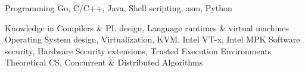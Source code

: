 


\begin{cvskills}



\cvskill
{Programming} %
{Go, C/C++, Java, Shell scripting, asm, Python\linebreak} %


\cvskill
{Knowledge in} %
{Compilers \& PL design, Language runtimes \& virtual machines\linebreak
 Operating System design, Virtualization, KVM, Intel VT-x, Intel MPK\linebreak
 Software security, Hardware Security extensions, Trusted Execution Environments\linebreak
  Theoretical CS, Concurrent \& Distributed Algorithms} %

\end{cvskills}
